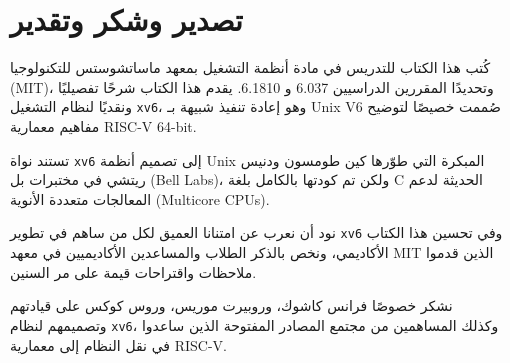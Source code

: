 \chapter*{تصدير وشكر وتقدير}
\label{CH:ACKS}

كُتب هذا الكتاب للتدريس في مادة أنظمة التشغيل بمعهد ماساتشوستس للتكنولوجيا (MIT)، وتحديدًا المقررين الدراسيين 6.037 و 6.1810.
يقدم هذا الكتاب شرحًا تفصيليًا ونقديًا لنظام التشغيل \texttt{xv6}، وهو إعادة تنفيذ شبيهة بـ Unix V6 صُممت خصيصًا لتوضيح مفاهيم معمارية \textsf{RISC-V} 64-bit.

تستند نواة \texttt{xv6} إلى تصميم أنظمة Unix المبكرة التي طوّرها كين طومسون ودنيس ريتشي في مختبرات بل (Bell Labs)، ولكن تم كودتها بالكامل بلغة C الحديثة لدعم المعالجات متعددة الأنوية (Multicore CPUs).

نود أن نعرب عن امتنانا العميق لكل من ساهم في تطوير \texttt{xv6} وفي تحسين هذا الكتاب الأكاديمي، ونخص بالذكر الطلاب والمساعدين الأكاديميين في معهد MIT الذين قدموا ملاحظات واقتراحات قيمة على مر السنين.

نشكر خصوصًا فرانس كاشوك، وروبيرت موريس، وروس كوكس على قيادتهم وتصميمهم لنظام \texttt{xv6}، وكذلك المساهمين من مجتمع المصادر المفتوحة الذين ساعدوا في نقل النظام إلى معمارية RISC-V.
